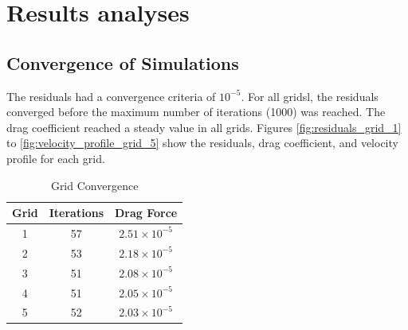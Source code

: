 \section{Results analyses}
\subsection{Convergence of Simulations}
The residuals had a convergence criteria of $10^{-5}$. For all gridsl, the residuals converged before the maximum number of iterations (1000) was reached. The drag coefficient reached a steady value in all grids. Figures \ref{fig:residuals_grid_1} to \ref{fig:velocity_profile_grid_5} show the residuals, drag coefficient, and velocity profile for each grid.
\begin{table}[h]
    \centering
    \caption{Grid Convergence}
    \label{tab:grid_convergence}
    \begin{tabular}{ccc}
        \toprule
        Grid & Iterations & Drag Force \\
        \midrule
        1 & 57 & $2.51 \times 10^{-5}$ \\
        2 & 53 & $2.18 \times 10^{-5}$ \\
        3 & 51 & $2.08 \times 10^{-5}$ \\
        4 & 51 & $2.05 \times 10^{-5}$ \\
        5 & 52 & $2.03 \times 10^{-5}$ \\
        \bottomrule
    \end{tabular}
\end{table}
